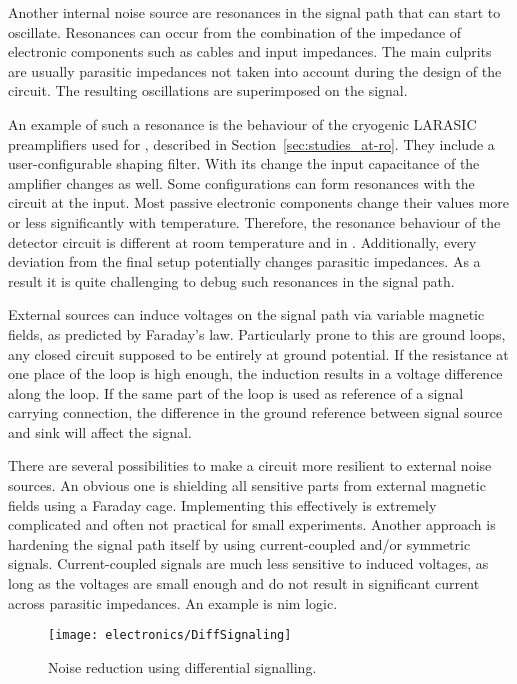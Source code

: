 Another internal noise source are resonances in the signal path that can start to oscillate.
Resonances can occur from the combination of the impedance of electronic components such as cables and input impedances.
The main culprits are usually parasitic impedances not taken into account during the design of the circuit.
The resulting oscillations are superimposed on the signal.

An example of such a resonance is the behaviour of the cryogenic LARASIC preamplifiers used for \AT{}, described in Section~\ref{sec:studies_at-ro}.
They include a user-configurable shaping filter.
With its change the input capacitance of the amplifier changes as well.
Some configurations can form resonances with the circuit at the input.
Most passive electronic components change their values more or less significantly with temperature.
Therefore, the resonance behaviour of the detector circuit is different at room temperature and in \lar{}.
Additionally, every deviation from the final setup potentially changes parasitic impedances.
As a result it is quite challenging to debug such resonances in the signal path.

External sources can induce voltages on the signal path via variable magnetic fields, as predicted by Faraday's law.
Particularly prone to this are ground loops, any closed circuit supposed to be entirely at ground potential.
If the resistance at one place of the loop is high enough, the induction results in a voltage difference along the loop.
If the same part of the loop is used as reference of a signal carrying connection, the difference in the ground reference between signal source and sink will affect the signal.

There are several possibilities to make a circuit more resilient to external noise sources.
An obvious one is shielding all sensitive parts from external magnetic fields using a Faraday cage.
Implementing this effectively is extremely complicated and often not practical for small experiments.
Another approach is hardening the signal path itself by using current-coupled and/or symmetric signals.
Current-coupled signals are much less sensitive to induced voltages, as long as the voltages are small enough and do not result in significant current across parasitic impedances.
An example is \gls{nim} logic.

\begin{figure}[htb]
	\centering
	\texttt{[image: electronics/DiffSignaling]}
	\caption[Differential signalling]{%
		Noise reduction using differential signalling.~\cite{diff_signal}
	}
	\label{fig:electronics_diff-signal}
\end{figure}

